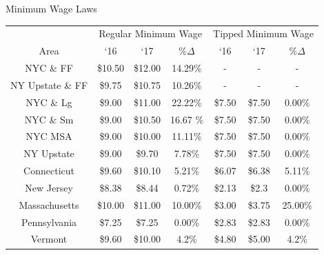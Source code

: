 \documentclass[xcolor=table]{beamer}
\begin{document}
\begin{spacing}{1.2}
\begin{frame}[label=main]{Minimum Wage Laws}
\footnotesize
\centering
\begin{tabular}{ c c c c c c c} \\ \hline \hline
&  \multicolumn{3}{c}{Regular Minimum Wage} & \multicolumn{3}{c}{Tipped Minimum Wage}\\
 Area & `16  & `17  & $\% \Delta$ & `16 & `17 &  $\% \Delta$  \\ \hline \hline
 NYC \& FF & \$10.50 & \$12.00 & 14.29\%& - & - & - \\
 NY Upstate \& FF  & \$9.75 & \$10.75 & 10.26\% & - & -& - \\
NYC \& Lg & \$9.00 & \$11.00 & 22.22\% & \$7.50 & \$7.50 & 0.00\%\\
NYC \& Sm & \$9.00 & \$10.50 & 16.67 \% & \$7.50 & \$7.50 & 0.00\%\\
NYC MSA & \$9.00 & \$10.00 & 11.11\% & \$7.50 & \$7.50 & 0.00\%\\
NY Upstate & \$9.00 & \$9.70 & 7.78\% & \$7.50 & \$7.50  & 0.00\% \\
Connecticut & \$9.60 & \$10.10 & 5.21\% & \$6.07 & \$6.38 & 5.11\% \\
New Jersey &  \$8.38 & \$8.44 & 0.72\%  & \$2.13 & \$2.3 & 0.00\% \\
 Massachusetts & \$10.00 & \$11.00 & 10.00\% & \$3.00 & \$3.75  & 25.00\% \\
Pennsylvania &  \$7.25 & \$7.25 & 0.00\% & \$2.83 & \$2.83 & 0.00\% \\
Vermont &  \$9.60 & \$10.00 & 4.2\% & \$4.80 & \$5.00 & 4.2\% \\
\end{tabular}
\raggedleft
\hyperlink{supplemental}{}
\end{frame}


\end{spacing}
\end{document}
